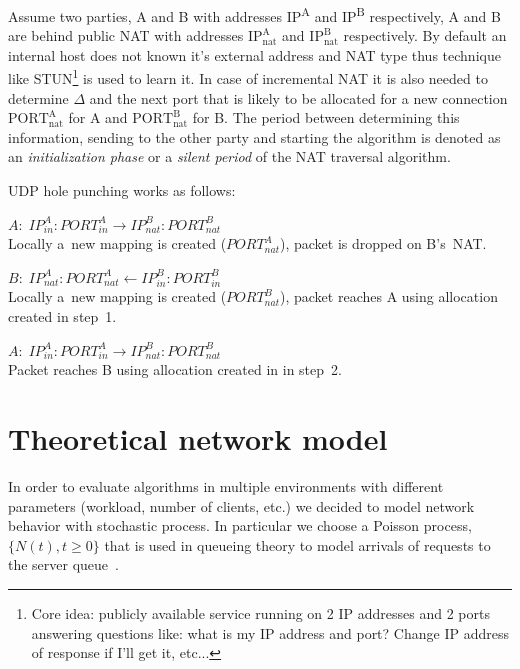 \documentclass[twoside]{article}
\newcommand{\ignore}[1]{}
\begin{document}
\begin{multicols}{2}
Assume two parties, A and B with addresses IP\textsuperscript{A} and IP\textsuperscript{B} respectively,
A and B are behind public NAT with addresses $\text{IP}^{\text{A}}_{\text{nat}}$ and $\text{IP}^{\text{B}}_{\text{nat}}$
respectively. By default an internal host does not known it's external address and NAT type thus technique like 
STUN\footnote{Core idea: publicly available service running on 2 IP addresses and 2 ports 
answering questions like: what is my IP address and port? Change IP address of response if I'll get it, etc...} 
is used to learn it. In case of incremental NAT it is also needed to determine $\Delta$ and the next port
that is likely to be allocated for a new connection $\text{PORT}^{\text{A}}_{\text{nat}}$ for A and $\text{PORT}^{\text{B}}_{\text{nat}}$
for B. The period between determining this information, sending to the other party and starting the algorithm is
denoted as an \emph{initialization phase} or a \emph{silent period}\ignore{\footnote{Since the algorithm itself does nothing.}} of the NAT traversal algorithm. 

UDP hole punching works as follows:\\
\begin{compactitem}
 \item [1.] $A: \; IP^A_{in}:PORT^A_{in} \longrightarrow IP^B_{nat}:PORT^B_{nat}$ \\
Locally a~new mapping is created ($PORT^A_{nat}$), packet is dropped on B's~NAT.
 \item [2.] $B: \; IP^A_{nat}:PORT^A_{nat} \longleftarrow  IP^B_{in}:PORT^B_{in}$ \\
Locally a~new mapping is created ($PORT^B_{nat}$), packet reaches A using allocation created in step~1.
 \item [3.] $A: \; IP^A_{in}:PORT^A_{in} \longrightarrow IP^B_{nat}:PORT^B_{nat}$ \\
Packet reaches B using allocation created in in step~2.
\end{compactitem}


\section{Theoretical network model}
In order to evaluate algorithms in multiple environments with different parameters (workload, number of clients, etc.)
we decided to model network behavior with stochastic process. In particular we choose a Poisson process, $\{N(t), t\geq0\}$ 
that is used in queueing theory to model arrivals of requests to the server queue~\citep{Nelson:1995:PSP:207382}. 


\end{multicols}
\end{document}

